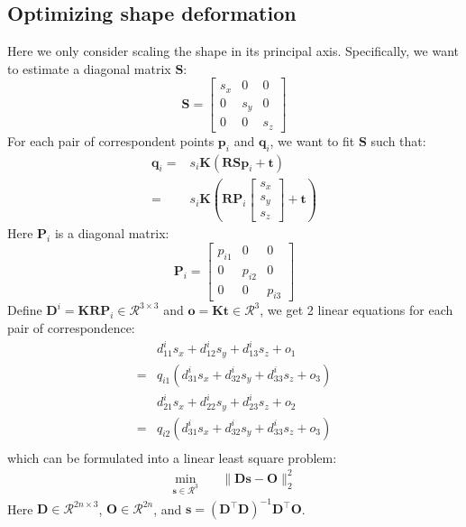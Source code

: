\documentclass[10pt,twocolumn,letterpaper]{article}
\begin{document}
\subsection{Optimizing shape deformation}
Here we only consider scaling the shape in its principal axis. Specifically, we want to estimate a diagonal matrix $\mathbf{S}$:
\begin{equation}
\mathbf{S}=\left [
\begin{array}{ccc}
s_x & 0 & 0 \\
0 & s_y & 0 \\
0 & 0 & s_z
\end{array}
\right ]
\end{equation}
For each pair of correspondent points $\mathbf{p}_i$ and $\mathbf{q}_i$, we want to fit $\mathbf{S}$ such that:
\begin{equation}
\begin{split}
\mathbf{q}_i=&s_i\mathbf{K}(\mathbf{R}\mathbf{S}\mathbf{p}_i + \mathbf{t})\\
=&s_i\mathbf{K}(\mathbf{R}\mathbf{P}_i\left [
\begin{array}{c}
s_x \\
s_y \\
s_z
\end{array}
\right ] + \mathbf{t})
\end{split}
\end{equation}
Here $\mathbf{P}_i$ is a diagonal matrix:
\begin{equation}
\mathbf{P}_i=\left [
\begin{array}{ccc}
p_{i1} & 0 & 0\\
0 & p_{i2} & 0\\
0 & 0 & p_{i3}
\end{array}
\right ]
\end{equation}
Define $\mathbf{D}^i = \mathbf{KRP}_i\in\mathcal{R}^{3\times 3}$ and $\mathbf{o}=\mathbf{Kt}\in\mathcal{R}^{3}$, we get 2 linear equations for each pair of correspondence:
\begin{equation}
\begin{split}
&d^i_{11}s_x+d^i_{12}s_y+d^i_{13}s_z+o_1\\
=&q_{i1}(d^i_{31}s_x+d^i_{32}s_y+d^i_{33}s_z+o_3)\\
&d^i_{21}s_x+d^i_{22}s_y+d^i_{23}s_z+o_2\\
=&q_{i2}(d^i_{31}s_x+d^i_{32}s_y+d^i_{33}s_z+o_3)\\
\end{split}
\end{equation}
which can be formulated into a linear least square problem:
\begin{equation}
\begin{split}
\min_{\mathbf{s}\in\mathcal{R}^3}&\quad \|\mathbf{D}\mathbf{s}-\mathbf{O}\|_2^2
\end{split}
\end{equation}
Here $\mathbf{D}\in\mathcal{R}^{2n\times 3}$, $\mathbf{O}\in\mathcal{R}^{2n}$, and $\mathbf{s}=(\mathbf{D}^\top\mathbf{D})^{-1}\mathbf{D}^\top\mathbf{O}$.
\end{document}
